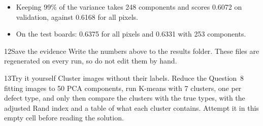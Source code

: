 \begin{labcheckpoint}
\begin{itemize}[leftmargin=1.2em,itemsep=2pt,topsep=1pt]
  \item Keeping 99\% of the variance takes 248 components and scores 0.6072 on validation, against 0.6168 for all pixels.
  \item On the test boards: 0.6375 for all pixels and 0.6331 with 253 components.
\end{itemize}
\end{labcheckpoint}


\begin{labquestion}{12}{Save the evidence}
Write the numbers above to the results folder. These files are regenerated on every run, so do not edit them by hand.
\end{labquestion}
\begin{labanswer}

\end{labanswer}


\begin{labquestion}{13}{Try it yourself}
Cluster images without their labels. Reduce the Question~8 fitting images to 50 PCA components, run K-means with 7 clusters, one per defect type, and only then compare the clusters with the true types, with the adjusted Rand index and a table of what each cluster contains. Attempt it in this empty cell before reading the solution.
\end{labquestion}

